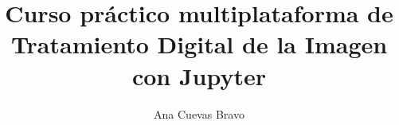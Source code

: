 \documentclass[a4paper,12pt]{report}
\begin{document}
\title{Curso práctico multiplataforma de Tratamiento Digital de la Imagen con Jupyter}
\author{ Ana Cuevas Bravo}
\maketitle

\newpage
{}

\renewcommand{\abstractname}{Resumen}
\renewcommand{\chaptername}{Capítulo}


\tableofcontents
\newpage
{}








\nocite{*}
\printbibliography
\end{document}
